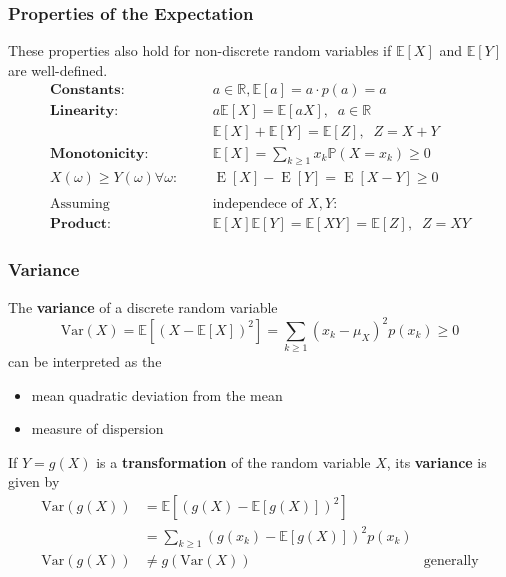 \subsubsection{Properties of the Expectation}
These properties also hold for non-discrete random variables if $\mathbb{E}[X]$ and $\mathbb{E}[Y]$ are well-defined.
\noindent\begin{align*}
    \textbf{Constants:}                   &  &  & a\in\mathbb{R},\mathbb{E}[a]=a\cdot p(a)=a                            \\
    \textbf{Linearity:}                   &  &  & a\mathbb{E}[X]=\mathbb{E}[aX],\;\;a\in \mathbb{R}                     \\
                                          &  &  & \mathbb{E}[X]+\mathbb{E}[Y]=\mathbb{E}[Z],\;\; Z=X+Y                  \\
    \textbf{Monotonicity:}                &  &  & \mathbb{E}[X]=\sum_{k\geq1}x_k\mathbb{P}(X=x_k)\geq0                  \\
    X(\omega)\geq Y(\omega)\forall\omega: &  &  & \operatorname{E}[X]-\operatorname{E}[Y]=\operatorname{E}[X-Y]\geq0    \\\\
    \text{Assuming}                       &  &  & \text{independece of } X,Y:                                           \\
    \textbf{Product:}                     &  &  & \mathbb{E}[X]\mathbb{E}[Y] = \mathbb{E}[XY] = \mathbb{E}[Z],\;\; Z=XY
\end{align*}

\subsubsection{Variance}
The \textbf{variance} of a discrete random variable
\noindent\begin{equation*}
    \mathrm{Var}(X) = \mathbb{E}[{(X-\mathbb{E}[X])}^2] = \sum_{k\geq1}{(x_k-\mu_X)}^2p(x_k)\geq0
\end{equation*}
can be interpreted as the
\begin{itemize}
    \item mean quadratic deviation from the mean
    \item measure of dispersion
\end{itemize}

\newpar{}
If $Y=g(X)$ is a \textbf{transformation} of the random variable $X$, its \textbf{variance} is given by
\noindent\begin{align*}
    \mathrm{Var}(g(X)) & =\mathbb{E}[{(g(X)-\mathbb{E}[g(X)])}^{2}]                                 \\
                       & =\sum_{k\geq1}{(g(x_{k})-\mathbb{E}[g(X)])}^{2}p(x_{k})                    \\
    \mathrm{Var}(g(X)) & \neq g(\mathrm{Var}(X))                                 & \text{generally}
\end{align*}

